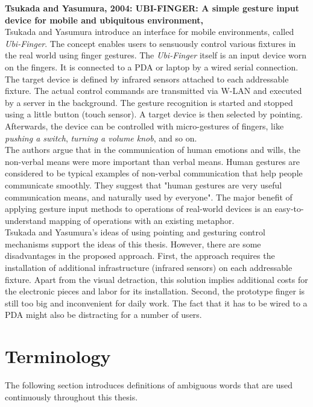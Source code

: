\textbf{Tsukada and Yasumura, 2004: UBI-FINGER: A simple gesture input device for mobile and ubiquitous environment, \cite{aisl2004-ubi-finger}} \\
Tsukada and Yasumura introduce an interface for mobile environments, called \emph{Ubi-Finger}. The concept enables users to sensuously control various fixtures in the real world using finger gestures. \cite{aisl2004-ubi-finger} The \emph{Ubi-Finger} itself is an input device worn on the fingers. It is connected to a PDA or laptop by a wired serial connection. The target device is defined by infrared sensors attached to each addressable fixture. The actual control commands are transmitted via W-LAN and executed by a server in the background. The gesture recognition is started and stopped using a little button (touch sensor). A target device is then selected by pointing. Afterwards, the device can be controlled with micro-gestures of fingers, like \emph{pushing a switch}, \emph{turning a volume knob}, and so on. \cite{aisl2004-ubi-finger} \\
The authors argue that in the communication of human emotions and wills, the non-verbal means were more important than verbal means. Human gestures are considered to be typical examples of non-verbal communication that help people communicate smoothly. They suggest that "human gestures are very useful communication means, and naturally used by everyone". \cite{aisl2004-ubi-finger} The major benefit of applying gesture input methods to operations of real-world devices is an easy-to-understand mapping of operations with an existing metaphor. \\
Tsukada and Yasumura's ideas of using pointing and gesturing control mechanisms support the ideas of this thesis. However, there are some disadvantages in the proposed approach. First, the approach requires the installation of additional infrastructure (infrared sensors) on each addressable fixture. Apart from the visual detraction, this solution implies additional costs for the electronic pieces and labor for its installation. Second, the prototype finger is still too big and inconvenient for daily work. The fact that it has to be wired to a PDA might also be distracting for a number of users. \\

\section{Terminology}

The following section introduces definitions of ambiguous words that are used continuously throughout this thesis. 

